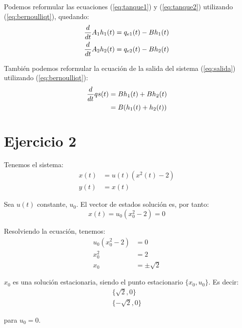 \documentclass[12pt]{article}
\begin{document}
Podemos reformular las ecuaciones (\ref{eq:tanque1}) y (\ref{eq:tanque2}) utilizando (\ref{eq:bernoulliqt}), quedando:
\begin{align*}
    {d \over dt} A_1 h_1(t) &= q_{e1}(t) - B h_1(t)\\
    {d \over dt} A_2 h_2(t) &= q_{e2}(t) - B h_2(t)
\end{align*}

También podemos reformular la ecuación de la salida del sistema (\ref{eq:salida}) utilizando (\ref{eq:bernoulliqt}):
\begin{align*}
    {d \over dt} qs(t) &= B h_1(t) + B h_2(t) \\
                       &= B (h_1(t) + h_2(t))
\end{align*}

\newpage

\section{Ejercicio 2}
Tenemos el sistema:
\begin{align*}
x(t) &= u(t) (x^2(t) - 2) \\
y(t) &= x(t)
\end{align*}

Sea $u(t)$ constante, $u_0$. El vector de estados solución es, por tanto:
\begin{equation*}
    x(t) = u_0 (x_0^2 - 2) = 0
\end{equation*}

Resolviendo la ecuación, tenemos:
\begin{align*}
    u_0 (x_0^2 - 2) &= 0\\
    x_0^2 &= 2\\
    x_0 &= \pm \sqrt{2}
\end{align*}

$x_0$ es una solución estacionaria, siendo el punto estacionario $\{x_0, u_0\}$. Es decir:
\begin{align*}
    \{\sqrt{2}, 0\}\\
    \{-\sqrt{2}, 0\}
\end{align*}

para $u_0 = 0$.
\newpage
\end{document}
